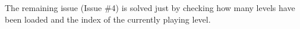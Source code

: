 The remaining issue (Issue \#4) is solved just by checking how many levels have been loaded and the index of the currently playing level.


